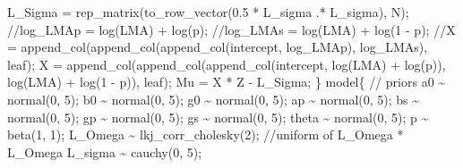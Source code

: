 \documentclass[
  12pt,
  letterpaper,
  DIV=11,
  numbers=noendperiod]{scrartcl}
\newenvironment{Shaded}{\begin{snugshade}}{\end{snugshade}}
\newcommand{\CommentTok}[1]{\textcolor[rgb]{0.37,0.37,0.37}{#1}}
\newcommand{\DecValTok}[1]{\textcolor[rgb]{0.68,0.00,0.00}{#1}}
\newcommand{\FloatTok}[1]{\textcolor[rgb]{0.68,0.00,0.00}{#1}}
\newcommand{\KeywordTok}[1]{\textcolor[rgb]{0.00,0.23,0.31}{#1}}
\newcommand{\NormalTok}[1]{\textcolor[rgb]{0.00,0.23,0.31}{#1}}
\begin{document}
\begin{Shaded}
\begin{Highlighting}[]
\NormalTok{  L\_Sigma = rep\_matrix(to\_row\_vector(}\FloatTok{0.5}\NormalTok{ * L\_sigma .* L\_sigma), N);}
  \CommentTok{//log\_LMAp = log(LMA) + log(p);}
  \CommentTok{//log\_LMAs = log(LMA) + log(1 {-} p);}
  \CommentTok{//X = append\_col(append\_col(append\_col(intercept, log\_LMAp), log\_LMAs), leaf);}
\NormalTok{  X = append\_col(append\_col(append\_col(intercept,}
\NormalTok{    log(LMA) + log(p)),}
\NormalTok{    log(LMA) + log(}\DecValTok{1}\NormalTok{ {-} p)),}
\NormalTok{     leaf);}
\NormalTok{  Mu = X * Z {-} L\_Sigma;}
\NormalTok{\}}
\KeywordTok{model}\NormalTok{\{}
  \CommentTok{// priors}
\NormalTok{  a0 \textasciitilde{} normal(}\DecValTok{0}\NormalTok{, }\DecValTok{5}\NormalTok{);}
\NormalTok{  b0 \textasciitilde{} normal(}\DecValTok{0}\NormalTok{, }\DecValTok{5}\NormalTok{);}
\NormalTok{  g0 \textasciitilde{} normal(}\DecValTok{0}\NormalTok{, }\DecValTok{5}\NormalTok{);}
\NormalTok{  ap \textasciitilde{} normal(}\DecValTok{0}\NormalTok{, }\DecValTok{5}\NormalTok{);}
\NormalTok{  bs \textasciitilde{} normal(}\DecValTok{0}\NormalTok{, }\DecValTok{5}\NormalTok{);}
\NormalTok{  gp \textasciitilde{} normal(}\DecValTok{0}\NormalTok{, }\DecValTok{5}\NormalTok{);}
\NormalTok{  gs \textasciitilde{} normal(}\DecValTok{0}\NormalTok{, }\DecValTok{5}\NormalTok{);}
\NormalTok{  theta \textasciitilde{} normal(}\DecValTok{0}\NormalTok{, }\DecValTok{5}\NormalTok{);}
\NormalTok{  p \textasciitilde{} beta(}\DecValTok{1}\NormalTok{, }\DecValTok{1}\NormalTok{);}
\NormalTok{  L\_Omega \textasciitilde{} lkj\_corr\_cholesky(}\DecValTok{2}\NormalTok{); }\CommentTok{//uniform of L\_Omega * L\_Omega\textquotesingle{}}
\NormalTok{  L\_sigma \textasciitilde{} cauchy(}\DecValTok{0}\NormalTok{, }\DecValTok{5}\NormalTok{);}


\end{Highlighting}
\end{Shaded}
\end{document}
